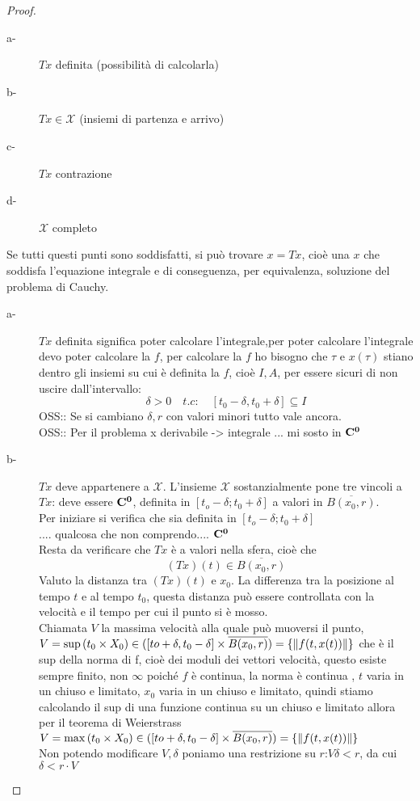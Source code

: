 \begin{proof}
\begin{description}
		\item[a-] $Tx$ definita (possibilità di calcolarla)
		\item[b-] $Tx\in\mathcal{X}$ (insiemi di partenza e arrivo)
		\item[c-] $Tx$ contrazione
		\item[d-] $\mathcal{X}$ completo
	\end{description}
	Se tutti questi punti sono soddisfatti, si può trovare $x=Tx$, cioè una $x$ che soddisfa l'equazione integrale e di conseguenza, per equivalenza, soluzione del problema di Cauchy.  
	\begin{description}
		\item[a-] $Tx$ definita significa poter calcolare l'integrale,per poter calcolare l'integrale devo poter calcolare la $f$, per calcolare la $f$ ho bisogno che $\tau$ e $x(\tau)$ stiano dentro gli insiemi su cui è definita la $f$, cioè $I,A$, per essere sicuri di non uscire dall'intervallo:
		$$\delta>0\quad t.c:\quad \left[t_0-\delta,t_0+\delta\right]\subseteq I$$
		OSS:: Se si cambiano $\delta, r$ con valori minori tutto vale ancora.\\
		OSS:: Per il problema x derivabile -> integrale  ... mi sosto in $\mathbf{C^{0}}$
		\item[b-] $Tx$ deve appartenere a $\mathcal{X}$. L'insieme $\mathcal{X}$ sostanzialmente pone tre vincoli a $Tx$: deve essere $\mathbf{C^{0}}$, definita in $\left[t_o-\delta;t_0+\delta\right]$ a valori in $\overline{B(x_0,r)}$.\\
		Per iniziare si verifica che sia definita in $\left[t_o-\delta;t_0+\delta\right]$\\
		.... qualcosa che non comprendo.... $\mathbf{C^{0}}$\\
		Resta da verificare che $Tx$ è a valori nella sfera, cioè che 
		$$(Tx)(t) \in \overline{B(x_0,r)}$$
		Valuto la distanza tra $(Tx)(t)$ e $x_0$. La differenza tra la posizione al tempo $t$ e al tempo $t_0$, questa distanza può essere controllata con la velocità e il tempo per cui il punto si è mosso.\\
		Chiamata $V$ la massima velocità alla quale può muoversi il punto, $V=\sup\limits{(t_0\times X_0)\in (\left[to+\delta,t_0-\delta\right]\times\overline{B(x_0,r)})}=\left\{\left\|f(t,x(t))\right\|\right\}$ che è il sup della norma di f, cioè dei moduli dei vettori velocità, questo esiste sempre finito, non $\infty$ poiché $f$ è continua, la norma è continua , $t$ varia in un chiuso e limitato, $x_0$ varia in un chiuso e limitato, quindi stiamo calcolando  il sup di una funzione continua su un chiuso e limitato allora per il teorema di Weierstrass $V=\max\limits{(t_0\times X_0)\in (\left[to+\delta,t_0-\delta\right]\times\overline{B(x_0,r)})}=\left\{\left\|f(t,x(t))\right\|\right\}$\\
		Non potendo modificare $V, \delta$ poniamo una restrizione su $r$:$V\delta < r$, da cui $\delta < r\cdot V$
		

\end{description}
\end{proof}
